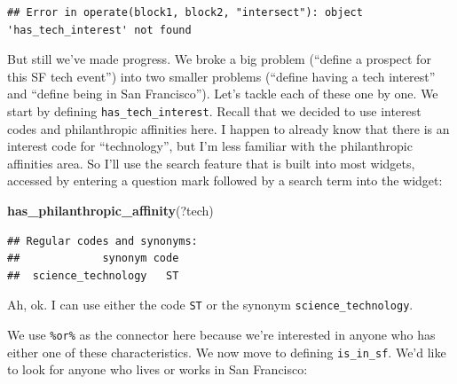 \documentclass[]{book}
\newenvironment{Shaded}{\begin{snugshade}}{\end{snugshade}}
\newcommand{\KeywordTok}[1]{\textcolor[rgb]{0.13,0.29,0.53}{\textbf{#1}}}
\newcommand{\NormalTok}[1]{#1}
\newcommand{\OperatorTok}[1]{\textcolor[rgb]{0.81,0.36,0.00}{\textbf{#1}}}
\newcommand{\StringTok}[1]{\textcolor[rgb]{0.31,0.60,0.02}{#1}}
\begin{document}
\begin{verbatim}
## Error in operate(block1, block2, "intersect"): object 'has_tech_interest' not found
\end{verbatim}

But still we've made progress. We broke a big problem (``define a prospect for this SF tech event'') into two smaller problems (``define having a tech interest'' and ``define being in San Francisco''). Let's tackle each of these one by one. We start by defining \texttt{has\_tech\_interest}. Recall that we decided to use interest codes and philanthropic affinities here. I happen to already know that there is an interest code for ``technology'', but I'm less familiar with the philanthropic affinities area. So I'll use the search feature that is built into most widgets, accessed by entering a question mark followed by a search term into the widget:

\begin{Shaded}
\begin{Highlighting}[]
\KeywordTok{has_philanthropic_affinity}\NormalTok{(?tech)}
\end{Highlighting}
\end{Shaded}

\begin{verbatim}
## Regular codes and synonyms:
##             synonym code
##  science_technology   ST
\end{verbatim}

Ah, ok. I can use either the code \texttt{ST} or the synonym \texttt{science\_technology}.

\begin{Shaded}
\end{Shaded}

We use \texttt{\%or\%} as the connector here because we're interested in anyone who has either one of these characteristics. We now move to defining \texttt{is\_in\_sf}. We'd like to look for anyone who lives or works in San Francisco:

\begin{Shaded}
\end{Shaded}
\end{document}
